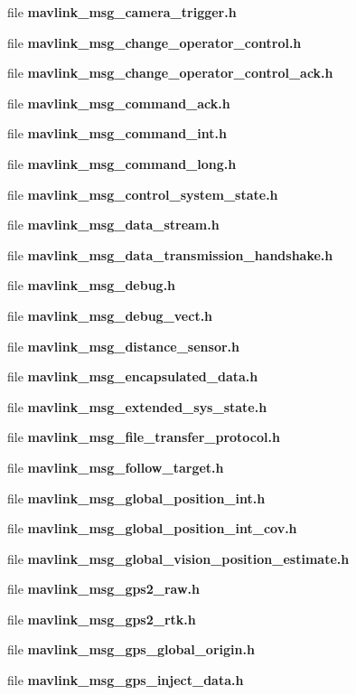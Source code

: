 \begin{DoxyCompactItemize}
file \textbf{ mavlink\+\_\+msg\+\_\+camera\+\_\+trigger.\+h}
\item 
file \textbf{ mavlink\+\_\+msg\+\_\+change\+\_\+operator\+\_\+control.\+h}
\item 
file \textbf{ mavlink\+\_\+msg\+\_\+change\+\_\+operator\+\_\+control\+\_\+ack.\+h}
\item 
file \textbf{ mavlink\+\_\+msg\+\_\+command\+\_\+ack.\+h}
\item 
file \textbf{ mavlink\+\_\+msg\+\_\+command\+\_\+int.\+h}
\item 
file \textbf{ mavlink\+\_\+msg\+\_\+command\+\_\+long.\+h}
\item 
file \textbf{ mavlink\+\_\+msg\+\_\+control\+\_\+system\+\_\+state.\+h}
\item 
file \textbf{ mavlink\+\_\+msg\+\_\+data\+\_\+stream.\+h}
\item 
file \textbf{ mavlink\+\_\+msg\+\_\+data\+\_\+transmission\+\_\+handshake.\+h}
\item 
file \textbf{ mavlink\+\_\+msg\+\_\+debug.\+h}
\item 
file \textbf{ mavlink\+\_\+msg\+\_\+debug\+\_\+vect.\+h}
\item 
file \textbf{ mavlink\+\_\+msg\+\_\+distance\+\_\+sensor.\+h}
\item 
file \textbf{ mavlink\+\_\+msg\+\_\+encapsulated\+\_\+data.\+h}
\item 
file \textbf{ mavlink\+\_\+msg\+\_\+extended\+\_\+sys\+\_\+state.\+h}
\item 
file \textbf{ mavlink\+\_\+msg\+\_\+file\+\_\+transfer\+\_\+protocol.\+h}
\item 
file \textbf{ mavlink\+\_\+msg\+\_\+follow\+\_\+target.\+h}
\item 
file \textbf{ mavlink\+\_\+msg\+\_\+global\+\_\+position\+\_\+int.\+h}
\item 
file \textbf{ mavlink\+\_\+msg\+\_\+global\+\_\+position\+\_\+int\+\_\+cov.\+h}
\item 
file \textbf{ mavlink\+\_\+msg\+\_\+global\+\_\+vision\+\_\+position\+\_\+estimate.\+h}
\item 
file \textbf{ mavlink\+\_\+msg\+\_\+gps2\+\_\+raw.\+h}
\item 
file \textbf{ mavlink\+\_\+msg\+\_\+gps2\+\_\+rtk.\+h}
\item 
file \textbf{ mavlink\+\_\+msg\+\_\+gps\+\_\+global\+\_\+origin.\+h}
\item 
file \textbf{ mavlink\+\_\+msg\+\_\+gps\+\_\+inject\+\_\+data.\+h}
\item 

\end{DoxyCompactItemize}
